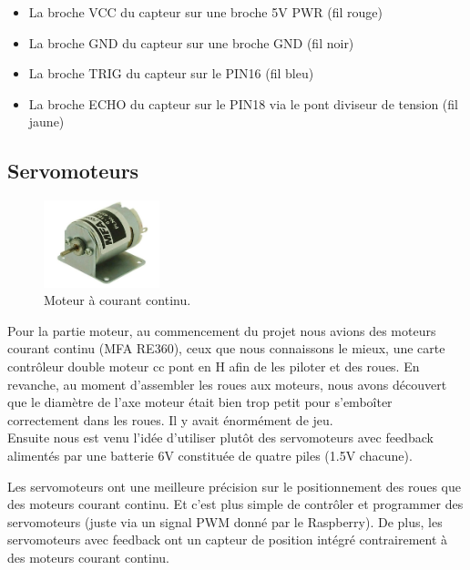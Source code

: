 \documentclass[a4paper,12pt]{report}  %
\begin{document}
\begin{itemize}
	\item La broche VCC du capteur sur une broche 5V PWR (fil rouge)
	\item La broche GND du capteur sur une broche GND (fil noir)
	\item La broche TRIG du capteur sur le PIN16 (fil bleu)
	\item La broche ECHO du capteur sur le PIN18 via le pont diviseur de tension (fil jaune) 
\end{itemize}

\subsection{Servomoteurs}

\begin{figure}[H]
	\centering
	\includegraphics[width=0.3\textwidth]{./attachments/moteur_continu.jpg}
	\caption{Moteur à courant continu.}
	
\end{figure}


Pour la partie moteur, au commencement du projet nous avions des moteurs courant continu (MFA RE360), ceux que nous connaissons le mieux, une carte contrôleur double moteur cc pont en H afin de les piloter et des roues. En revanche, au moment d’assembler les roues aux moteurs, nous avons découvert que le diamètre de l’axe moteur était bien trop petit pour s’emboîter correctement dans les roues. Il y avait énormément de jeu. \\



Ensuite nous est venu l’idée d’utiliser plutôt des servomoteurs avec feedback alimentés par une batterie 6V constituée de quatre piles (1.5V chacune).

Les servomoteurs ont une meilleure précision sur le positionnement des roues que des moteurs courant continu. Et c’est plus simple de contrôler et programmer des servomoteurs (juste via un signal PWM donné par le Raspberry). De plus, les servomoteurs avec feedback ont un capteur de position intégré contrairement à des moteurs courant continu. 
\end{document}
